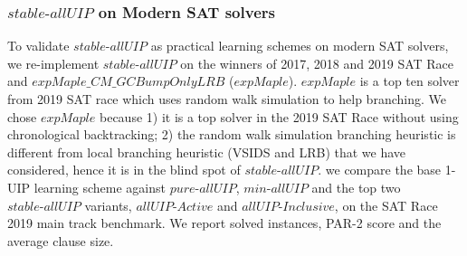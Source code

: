 \documentclass[runningheads]{llncs}
\newcommand{\allUip}{\textit{stable-allUIP}}
\newcommand{\allUipPure}{\textit{pure-allUIP}\xspace}
\newcommand{\allUipMin}{\textit{min-allUIP}\xspace}
\newcommand{\allUipAct}{\textit{allUIP-Active}}
\newcommand{\allUipIn}{\textit{allUIP-Inclusive}}
\newcommand{\allUipEx}{\textit{allUIP-Exclusive}}
\newcommand{\expSAT}{\textit{expMaple\_CM\_GCBumpOnlyLRB} }
\newcommand{\expSATShort}{\textit{expMaple} }
\begin{document}


\subsubsection{$\allUip$ on Modern SAT solvers}
To validate $\allUip$ as practical learning schemes on modern SAT
solvers, we re-implement $\allUip$ on the winners of 2017, 2018 and 2019
SAT Race\cite{luo2017effective,ryvchin2018maple,Stepan2019MapleLCMDistChronoBT} and $\expSAT$\cite{MdSolimul2019expMalpe} ($\expSATShort$). $\expSATShort$
is a top ten solver from 2019 SAT race which uses random walk
simulation to help branching. We chose $\expSATShort$ because 1) it is
a top solver in the 2019 SAT Race without using chronological
backtracking; 2) the random walk simulation 
branching heuristic is different from local branching heuristic (VSIDS and LRB) that we have considered,
hence it is in the blind spot of $\allUip$.
we compare the base 1-UIP learning scheme against $\allUipPure$,
$\allUipMin$ and the top two $\allUip$ variants, $\allUipAct$ and
$\allUipIn$, on the SAT Race 2019 main track benchmark. We report
solved instances, PAR-2 score and the average clause size.
\end{document}
